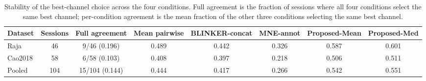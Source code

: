 \begin{table}[ht]
  \centering
  \scriptsize
  \setlength{\tabcolsep}{3pt}
  \caption{Stability of the best-channel choice across the four conditions. Full agreement is the fraction of sessions where all four conditions select the same best channel; per-condition agreement is the mean fraction of the other three conditions selecting the same best channel.}
  \label{tab:channel-robustness}
  \begin{tabular}{lccccccc}
    \toprule
    Dataset & Sessions & Full agreement & Mean pairwise & BLINKER-concat & MNE-annot & Proposed-Mean & Proposed-Med \\
    \midrule
    Raja & 46 & 9/46 (0.196) & 0.489 & 0.442 & 0.326 & 0.587 & 0.601 \\
    Cao2018 & 58 & 6/58 (0.103) & 0.408 & 0.397 & 0.218 & 0.506 & 0.511 \\
    Pooled & 104 & 15/104 (0.144) & 0.444 & 0.417 & 0.266 & 0.542 & 0.551 \\
    \bottomrule
  \end{tabular}
\end{table}
